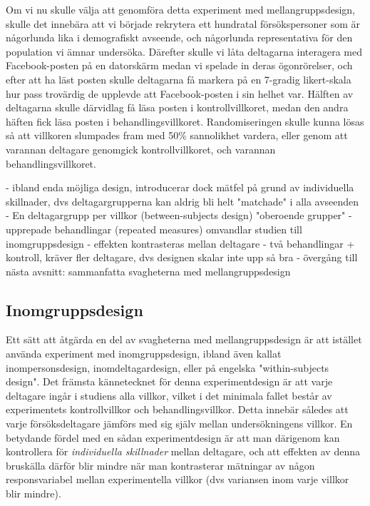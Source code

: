 \documentclass[
]{book}
\begin{document}
Om vi nu skulle välja att genomföra detta experiment med mellangruppsdesign, skulle det innebära att vi började rekrytera ett hundratal försökspersoner som är någorlunda lika i demografiskt avseende, och någorlunda representativa för den population vi ämnar undersöka. Därefter skulle vi låta deltagarna interagera med Facebook-posten på en datorskärm medan vi spelade in deras ögonrörelser, och efter att ha läst posten skulle deltagarna få markera på en 7-gradig likert-skala hur pass trovärdig de upplevde att Facebook-posten i sin helhet var. Hälften av deltagarna skulle därvidlag få läsa posten i kontrollvillkoret, medan den andra häften fick läsa posten i behandlingsvillkoret. Randomiseringen skulle kunna lösas så att villkoren slumpades fram med 50\% sannolikhet vardera, eller genom att varannan deltagare genomgick kontrollvillkoret, och varannan behandlingsvillkoret.

- ibland enda möjliga design, introducerar dock mätfel på grund av individuella skillnader, dvs deltagargrupperna kan aldrig bli helt "matchade" i alla avseenden - En deltagargrupp per villkor (between-subjects design) "oberoende grupper" - upprepade behandlingar (repeated measures) omvandlar studien till inomgruppsdesign - effekten kontrasteras mellan deltagare - två behandlingar + kontroll, kräver fler deltagare, dvs designen skalar inte upp så bra - övergång till nästa avsnitt: sammanfatta svagheterna med mellangruppsdesign

\hypertarget{sub07.5.4}{%
\subsection{Inomgruppsdesign}\label{sub07.5.4}}

Ett sätt att åtgärda en del av svagheterna med mellangruppsdesign är att istället använda experiment med inomgruppsdesign, ibland även kallat inompersonsdesign, inomdeltagardesign, eller på engelska "within-subjects design". Det främsta kännetecknet för denna experimentdesign är att varje deltagare ingår i studiens alla villkor, vilket i det minimala fallet består av experimentets kontrollvillkor och behandlingsvillkor. Detta innebär således att varje försöksdeltagare jämförs med sig själv mellan undersökningens villkor. En betydande fördel med en sådan experimentdesign är att man därigenom kan kontrollera för \emph{individuella skillnader} mellan deltagare, och att effekten av denna bruskälla därför blir mindre när man kontrasterar mätningar av någon responsvariabel mellan experimentella villkor (dvs variansen inom varje villkor blir mindre).
\end{document}

